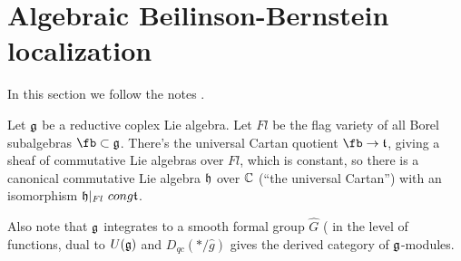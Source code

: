 \section{Algebraic Beilinson-Bernstein localization}

In this section we follow the notes \cite{ScholzeReal}.

Let $\mathfrak{g}$ be a reductive coplex Lie algebra.
Let $Fl$ be the flag variety of all Borel subalgebras $\fb \subset \fg$. 
There's the universal Cartan quotient $\fb \rightarrow \ft$, giving a sheaf of
commutative Lie algebras over $Fl$, which is constant, so there is a canonical
commutative Lie algebra $\mathfrak{h}$ over $\mathbb{C}$ (\enquote{the universal Cartan}) with
an isomorphism $\mathfrak{h}|_{Fl} \ cong \mathfrak{t}$.

Also note that $\mathfrak{g}$ integrates to a smooth formal group $\hat{G}$ ( in the
level of functions, dual to $U(\mathfrak{g})$ and $D_{qc} (* / \hat{g})$ gives the
derived category of $\mathfrak{g}$-modules.
